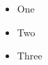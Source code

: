 \documentclass{article}
\begin{document}
\begin{itemize}
\item One
\item Two 
\item Three 
\end{itemize} 
\end{document}
